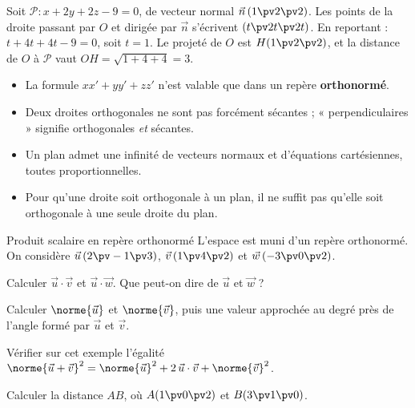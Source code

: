 \begin{exemple}
Soit $\mathcal{P}:x+2y+2z-9=0$, de vecteur normal $\vec n\,(1\pv2\pv2)$. Les points de la droite passant par $O$ et dirigée par $\vec n$
s'écrivent $(t\pv2t\pv2t)$. En reportant : $t+4t+4t-9=0$, soit $t=1$. Le projeté de $O$ est $H(1\pv2\pv2)$, et la distance de $O$ à
$\mathcal{P}$ vaut $OH=\sqrt{1+4+4}=3$.
\end{exemple}

\begin{attention}
\begin{itemize}[label={\color{otOrange}\textbullet},leftmargin=1.4em,itemsep=0.6mm,topsep=0.5mm]
  \item La formule $xx'+yy'+zz'$ n'est valable que dans un repère \textbf{orthonormé}.
  \item Deux droites orthogonales ne sont pas forcément sécantes ; « perpendiculaires » signifie orthogonales \emph{et} sécantes.
  \item Un plan admet une infinité de vecteurs normaux et d'équations cartésiennes, toutes proportionnelles.
  \item Pour qu'une droite soit orthogonale à un plan, il ne suffit pas qu'elle soit orthogonale à une seule droite du plan.
\end{itemize}
\end{attention}

\exercices
{}

\begin{exercice}[1]{Produit scalaire en repère orthonormé}
L'espace est muni d'un repère orthonormé. On considère $\vec u\,(2\pv-1\pv3)$, $\vec v\,(1\pv4\pv2)$ et $\vec w\,(-3\pv0\pv2)$.
\begin{questions}
  \item Calculer $\vec u\cdot\vec v$ et $\vec u\cdot\vec w$. Que peut-on dire de $\vec u$ et $\vec w$ ?
  \item Calculer $\norme{\vec u}$ et $\norme{\vec v}$, puis une valeur approchée au degré près de l'angle formé par $\vec u$ et $\vec v$.
  \item Vérifier sur cet exemple l'égalité $\norme{\vec u+\vec v}^2=\norme{\vec u}^2+2\,\vec u\cdot\vec v+\norme{\vec v}^2$.
  \item Calculer la distance $AB$, où $A(1\pv0\pv2)$ et $B(3\pv1\pv0)$.
\end{questions}
\end{exercice}


